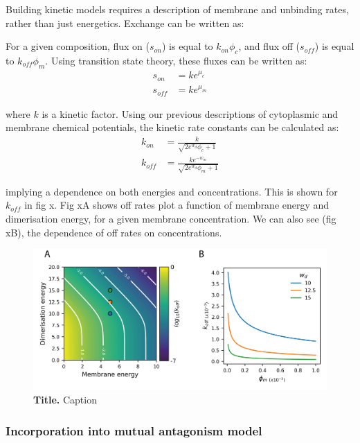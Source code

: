 \documentclass[12pt]{"article"}
\newcommand{\mycaption}[2]{\caption[#1]{\textbf{#1.} #2}}
\begin{document}
Building kinetic models requires a description of membrane and unbinding rates, rather than just energetics. Exchange can be written as:

\begin{center}
\end{center}

For a given composition, flux on ($s_{on}$) is equal to $k_{on}\phi_c$, and flux off ($s_{off}$) is equal to $k_{off}\phi_m$. Using transition state theory, these fluxes can be written as:
\begin{align}
s_{on} &= ke^{\mu_c}\\
s_{off} &= ke^{\mu_m}
\end{align}

where $k$ is a kinetic factor. Using our previous descriptions of cytoplasmic and membrane chemical potentials, the kinetic rate constants can be calculated as:
\begin{align}
k_{on} &= \frac{k}{\sqrt{2e^{w_d}\phi_c+ 1}}\\
k_{off} &= \frac{ke^{-w_m}}{\sqrt{2e^{w_d}\phi_m+ 1}}
\end{align}

implying a dependence on both energies and concentrations. This is shown for $k_{off}$ in fig x. Fig xA shows off rates plot a function of membrane energy and dimerisation energy, for a given membrane concentration. We can also see (fig xB), the dependence of off rates on concentrations.

\begin{figure}[!h]
\includegraphics[scale=1]{thermodynamic_model_koff}
\setlength{\abovecaptionskip}{20pt}
\centering
\mycaption{Title}{Caption}
\label{fig:thermodynamic_model_koff}
\end{figure}

\subsubsection{Incorporation into mutual antagonism model}
\end{document}
